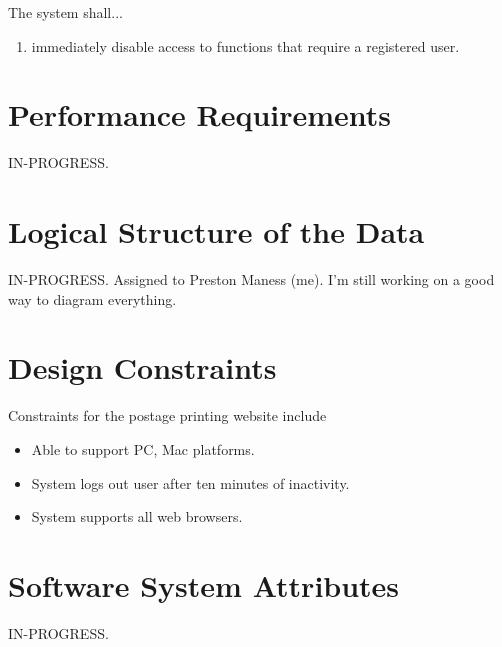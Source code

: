 \documentclass{scrreprt}
\begin{document}
The system shall...

\begin{enumerate}
\item immediately disable access to functions that require a registered user.
\end{enumerate}

\section{Performance Requirements}

IN-PROGRESS.

\section{Logical Structure of the Data}

IN-PROGRESS. Assigned to Preston Maness (me). I'm still working on a good 
way to diagram everything.

\section{Design Constraints}

Constraints for the postage printing website include

\begin{itemize}
\item Able to support PC, Mac platforms.
\item System logs out user after ten minutes of inactivity.
\item System supports all web browsers.
\end{itemize}

\section{Software System Attributes}

IN-PROGRESS.

\end{document}
